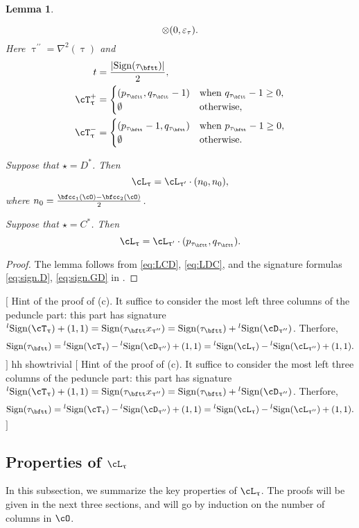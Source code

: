 \documentclass[12pt,a4paper]{amsart}
\newcommand{\trivial}[2][]{\if\relax\detokenize{#1}\relax
  {%
      \color{orange} \vspace{0em} $[$  #2 $]$
      \color{black}
  }
  \else
\ifx#1h
\ifcsname showtrivial\endcsname
{%
    \color{orange} \vspace{0em}  $[$ #2 $]$
    \color{black}
}
\fi
\else {\red Wrong argument!} \fi
\fi
}
\def\abs#1{\left|{#1}\right|}
\def\DD{\nabla}
\numberwithin{equation}{section}
\newtheorem{lem}[thm]{Lemma}
\theoremstyle{remark}
\def\lsign{{}^l\mathrm{Sign}}
\def\ssign{\mathrm{Sign}}
\def\uptaupp{\uptau^{\prime\prime}}
\begin{document}
\begin{lem}
\begin{enuma}
\begin{equation}
    \otimes(0,\varepsilon_{\tau}).
  \end{equation}
  Here $\uptaupp = \DD^{2}(\uptau)$ and
  \[
  \begin{split}
    t &  = \frac{\abs{\ssign(\tau_{\bftt})}}{2},\\
    \pcT_{\uptau}& = \begin{cases} (p_{\tau_{\bftt}},q_{\tau_{\bftt}}-1) &
       \text{when
      } q_{\tau_{\bftt}}-1\geq 0 , \\
      \emptyset & \text{otherwise},
    \end{cases}\\
    \ncT_{\uptau}& = \begin{cases} (p_{\tau_{\bftt}}-1,q_{\tau_{\bftt}}) &
       \text{when
      } p_{\tau_{\bftt}}-1\geq 0  ,\\
      \emptyset & \text{otherwise}.
    \end{cases}\\
  \end{split}
\]
\item
  Suppose that $\star = D^{*}$.  Then
  \[
    \ac_{\uptau}=\ac_{\uptau'} \cdot (n_{0},n_{0}),
  \]
  where $n_{0} = \frac{\bfcc_{1}(\cO)-\bfcc_{2}(\cO)}{2}$.
\item
  Suppose that $\star = C^{*}$.  Then
  \[
    \ac_{\uptau}=\ac_{\uptau'} \cdot (p_{\tau_{\bftt}},q_{\tau_{\bftt}}).
\]
\end{enuma}
\end{lem}
\begin{proof}
 The lemma follows from \eqref{eq:LCD}, \eqref{eq:LDC}, and
 the signature formulas \eqref{eq:sign.D}, \eqref{eq:sign.GD}
 in .
\end{proof}



\trivial[h]{Hint of the proof of (c). It suffice to consider the most left three
  columns of the peduncle part: this part has signature $\lsign(\cT_{\uptau})
  +(1,1) = \ssign(\tau_{\bftt}x_{\uptaupp})=
  \ssign(\tau_{\bftt})+\lsign(\cD_{\uptaupp})$. Therfore,
  \[\ssign(\tau_{\bftt}) = \lsign(\cT_{\uptau})-\lsign(\cD_{\uptaupp})
  + (1,1) = \lsign(\ac_{\uptau})-\lsign(\ac_{\uptaupp})+(1,1).
  \]
}

\subsection{Properties of $\ac_{\uptau}$}
\label{sec:ac}
In this subsection, we summarize the key properties of $\ac_{\uptau}$. The proofs will be given in the next three sections, and
will go by induction on the number of columns in $\cO$.
\end{document}
